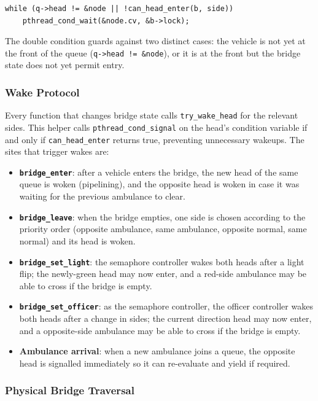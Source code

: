 \documentclass[12pt]{article}
\begin{document}
\begin{lstlisting}[style=cstyle, caption={Wait loop in \texttt{bridge\_enter}.}]
while (q->head != &node || !can_head_enter(b, side))
    pthread_cond_wait(&node.cv, &b->lock);
\end{lstlisting}

The double condition guards against two distinct cases: the vehicle is not
yet at the front of the queue (\texttt{q->head != \&node}), or it is at
the front but the bridge state does not yet permit entry.

\subsubsection{Wake Protocol}

Every function that changes bridge state calls \texttt{try\_wake\_head}
for the relevant sides. This helper calls \texttt{pthread\_cond\_signal}
on the head's condition variable if and only if \texttt{can\_head\_enter}
returns true, preventing unnecessary wakeups. The sites that trigger wakes
are:

\begin{itemize}
  \item \textbf{\texttt{bridge\_enter}}: after a vehicle enters the bridge,
    the new head of the same queue is woken (pipelining), and the opposite
    head is woken in case it was waiting for the previous ambulance to clear.
  \item \textbf{\texttt{bridge\_leave}}: when the bridge empties, one side
    is chosen according to the priority order (opposite ambulance,
    same ambulance, opposite normal, same normal) and its head is woken.
  \item \textbf{\texttt{bridge\_set\_light}}: the semaphore controller
    wakes both heads after a light flip; the newly-green head may now
    enter, and a red-side ambulance may be able to cross if the bridge
    is empty.
    \item \textbf{\texttt{bridge\_set\_officer}}: as the semaphore controller, the officer controller
    wakes both heads after a change in sides; the current direction head may now
    enter, and a opposite-side ambulance may be able to cross if the bridge
    is empty.
  \item \textbf{Ambulance arrival}: when a new ambulance joins a queue, the
    opposite head is signalled immediately so it can re-evaluate and
    yield if required.
\end{itemize}

\subsubsection{Physical Bridge Traversal}
\end{document}

